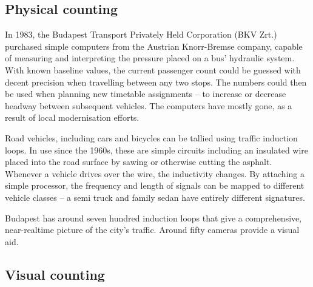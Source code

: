 \subsection{Physical counting}

In 1983, the Budapest Transport Privately Held Corporation (BKV Zrt.) purchased simple computers from the Austrian Knorr-Bremse company, capable of measuring and interpreting the pressure placed on a bus' hydraulic system.\cite{ik260_article} With known baseline values, the current passenger count could be guessed with decent precision when travelling between any two stops. The numbers could then be used when planning new timetable assignments -- to increase or decrease headway between subsequent vehicles. The computers have mostly gone, as a result of local modernisation efforts.

Road vehicles, including cars and bicycles can be tallied using traffic induction loops. In use since the 1960s, these are simple circuits including an insulated wire placed into the road surface by sawing or otherwise cutting the asphalt. Whenever a vehicle drives over the wire, the inductivity changes. By attaching a simple processor, the frequency and length of signals can be mapped to different vehicle classes -- a semi truck and family sedan have entirely different signatures.

Budapest has around seven hundred induction loops that give a comprehensive, near-realtime picture of the city's traffic. Around fifty cameras provide a visual aid.

\subsection{Visual counting}
